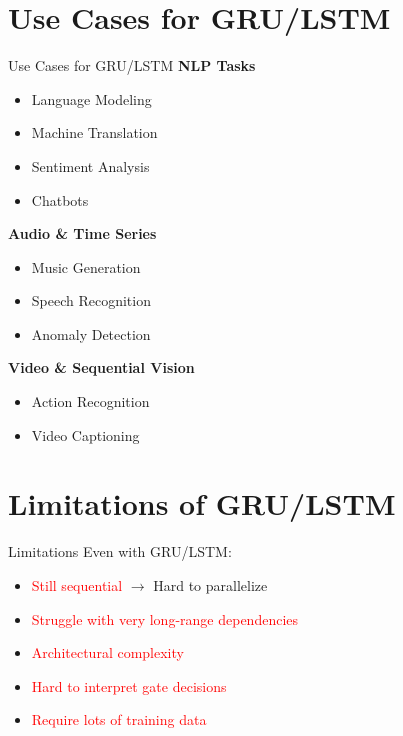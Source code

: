 \section{Use Cases for GRU/LSTM}
\begin{frame}[allowframebreaks]{Use Cases for GRU/LSTM}
    \textbf{\faMobile\enspace NLP Tasks}
    \begin{itemize}
        \item Language Modeling
        \item Machine Translation
        \item Sentiment Analysis
        \item Chatbots
    \end{itemize}

\framebreak
    \textbf{\faHeadphones\enspace Audio \& Time Series}
    \begin{itemize}
        \item Music Generation
        \item Speech Recognition
        \item Anomaly Detection
    \end{itemize}

\framebreak
    \textbf{\faVideoCamera\enspace Video \& Sequential Vision}
    \begin{itemize}
        \item Action Recognition
        \item Video Captioning
    \end{itemize}
\end{frame}


\section{Limitations of GRU/LSTM}
\begin{frame}{Limitations}
    Even with GRU/LSTM:

    \begin{itemize}
        \setlength{\itemsep}{1em}
        \item \textcolor{red}{Still sequential} $\rightarrow$ Hard to parallelize
        \item \textcolor{red}{Struggle with very long-range dependencies}
        \item \textcolor{red}{Architectural complexity}
        \item \textcolor{red}{Hard to interpret gate decisions}
        \item \textcolor{red}{Require lots of training data}
    \end{itemize}
\end{frame}


